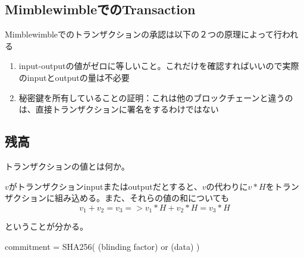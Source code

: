 \documentclass{jsarticle}
\begin{document}
\subsection{MimblewimbleでのTransaction}
Mimblewimbleでのトランザクションの承認は以下の２つの原理によって行われる
\begin{enumerate}
    \item input-outputの値がゼロに等しいこと。これだけを確認すればいいので実際のinputとoutputの量は不必要
    \item 秘密鍵を所有していることの証明：これは他のブロックチェーンと違うのは、直接トランザクションに署名をするわけではない
\end{enumerate}

\subsection{残高}
トランザクションの値とは何か。

$v$がトランザクションinputまたはoutputだとすると、$v$の代わりに$v*H$をトランザクションに組み込める。また、それらの値の和についても
\begin{equation}
    v_1 + v_2 = v_3 => v_1*H + v_2*H = v_3*H
\end{equation}

ということが分かる。

\begin{center}
	commitment = SHA256( (blinding factor) or (data) )
\end{center}
\end{document}

